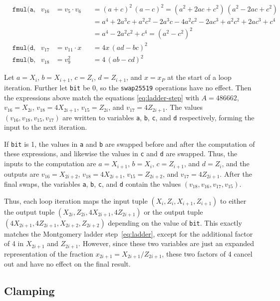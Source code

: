 \documentclass[manuscript]{acmart}
\begin{document}
\begin{align*}
    & \texttt{fmul(a, d, f);} & v_{16} &= v_5 \cdot v_6  &&= (a + c)^2\,(a - c)^2 = (a^2 + 2ac + c^2)\,(a^2 - 2ac + c^2) \\
    &                       &        &                 &&= a^4 + 2a^3 c + a^2 c^2 - 2a^3 c - 4 a^2 c^2 - 2a c^3 + a^2 c^2 + 2a c^3 + c^4 \\
    &                       &        &                 &&= a^4 - 2a^2 c^2 + c^4 = (a^2 - c^2)^2 \\
    & \texttt{fmul(d, b, x);} & v_{17} &= v_{11} \cdot x &&= 4x\,(ad - bc)^2 \\
    & \texttt{fmul(b, e, e);} & v_{18} &= v_9^2          &&= 4\,(ab - cd)^2
\end{align*}

Let $a = X_i$, $b = X_{i+1}$, $c = Z_i$, $d = Z_{i+1}$, and $x = x_P$ at the start of a loop iteration.
Further let \verb|bit| be 0, so the \verb|swap25519| operations have no effect.
Then the expressions above match the equations \eqref{eq:ladder-step} with $A = 486662$, $v_{16} = X_{2i}$, $v_{18} = 4X_{2i+1}$, $v_{15} = Z_{2i}$, and $v_{17} = 4Z_{2i+1}$.
The values $(v_{16}, v_{18}, v_{15}, v_{17})$ are written to variables \verb|a|, \verb|b|, \verb|c|, and \verb|d| respectively, forming the input to the next iteration.

If \verb|bit| is 1, the values in \verb|a| and \verb|b| are swapped before and after the computation of these expressions, and likewise the values in \verb|c| and \verb|d| are swapped.
Thus, the inputs to the computation are $a = X_{i+1}$, $b = X_i$, $c = Z_{i+1}$, and $d = Z_i$, and the outputs are $v_{16} = X_{2i+2}$, $v_{18} = 4X_{2i+1}$, $v_{15} = Z_{2i+2}$, and $v_{17} = 4Z_{2i+1}$.
After the final swaps, the variables \verb|a|, \verb|b|, \verb|c|, and \verb|d| contain the values $(v_{18}, v_{16}, v_{17}, v_{15})$.

Thus, each loop iteration maps the input tuple $(X_i, Z_i, X_{i+1}, Z_{i+1})$ to either the output tuple $(X_{2i}, Z_{2i}, 4X_{2i+1}, 4Z_{2i+1})$ or the output tuple $(4X_{2i+1}, 4Z_{2i+1}, X_{2i+2}, Z_{2i+2})$ depending on the value of \verb|bit|.
This exactly matches the Montgomery ladder step~\eqref{eq:ladder}, except for the additional factor of 4 in $X_{2i+1}$ and $Z_{2i+1}$.
However, since these two variables are just an expanded representation of the fraction $x_{2i+1} = X_{2i+1}/Z_{2i+1}$, these two factors of 4 cancel out and have no effect on the final result.

\subsection{Clamping}\label{sec:clamping}
\end{document}
